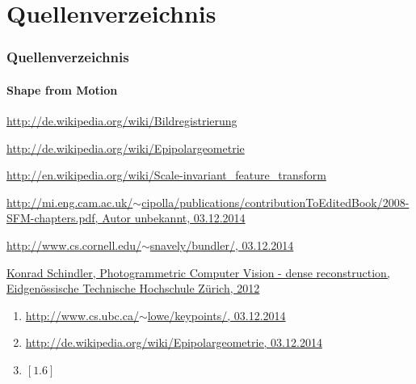 \documentclass{beamer}
\begin{document}
\section{Quellenverzeichnis}
\begin{frame}
	\frametitle{Quellenverzeichnis}
	\framesubtitle{Shape from Motion}
	
	\begin{tiny}
	\begin{enumerate}[label={[1.\arabic*]}]
		\item
		\href{http://de.wikipedia.org/wiki/Bildregistrierung}{http://de.wikipedia.org/wiki/Bildregistrierung}
		\item
		\href{http://de.wikipedia.org/wiki/Epipolargeometrie}{http://de.wikipedia.org/wiki/Epipolargeometrie}
		\item
		\href{http://en.wikipedia.org/wiki/Scale-invariant_feature_transform}{http://en.wikipedia.org/wiki/Scale-invariant\_feature\_transform}
		\item
		\href{http://mi.eng.cam.ac.uk/~cipolla/publications/contributionToEditedBook/2008-SFM-chapters.pdf}{http://mi.eng.cam.ac.uk/$\sim$cipolla/publications/contributionToEditedBook/2008-SFM-chapters.pdf, Autor unbekannt, 03.12.2014}
		\item
		\href{http://www.cs.cornell.edu/~snavely/bundler/}{http://www.cs.cornell.edu/$\sim$snavely/bundler/, 03.12.2014}
		\item
		\href{http://www.igp.ethz.ch/photogrammetry/education/lehrveranstaltungen/PCV_HS12/content_folder/PCV-HS2012-slides-multiview.pdf}{Konrad Schindler, Photogrammetric Computer Vision -  dense reconstruction, Eidgenössische Technische Hochschule Zürich, 2012}
	\end{enumerate}
	\vspace{1em}
	\begin{enumerate}[label={Fig. 1.\arabic*}]
		\item \href{http://www.cs.ubc.ca/~lowe/keypoints/}{http://www.cs.ubc.ca/$\sim$lowe/keypoints/, 03.12.2014}
		\item \href{http://de.wikipedia.org/wiki/Epipolargeometrie}{http://de.wikipedia.org/wiki/Epipolargeometrie, 03.12.2014}
		\item $\left[1.6\right]$
	\end{enumerate}
	\end{tiny}
\end{frame}
\end{document}
